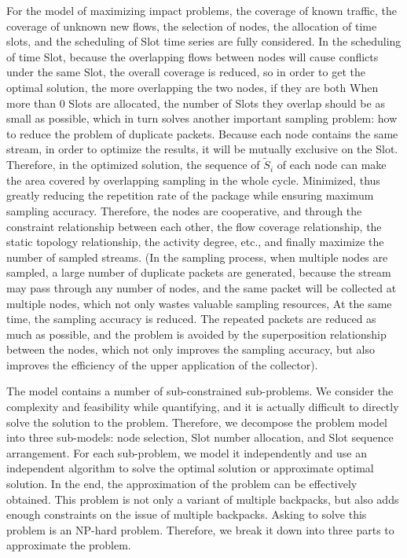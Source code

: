 \documentclass[conference,compsoc]{IEEEtran}
\begin{document}
For the model of maximizing impact problems, the coverage of known traffic, the coverage of unknown new flows, the selection of nodes, the allocation of time slots, and the scheduling of Slot time series are fully considered. In the scheduling of time Slot, because the overlapping flows between nodes will cause conflicts under the same Slot, the overall coverage is reduced, so in order to get the optimal solution, the more overlapping the two nodes, if they are both When more than 0 Slots are allocated, the number of Slots they overlap should be as small as possible, which in turn solves another important sampling problem: how to reduce the problem of duplicate packets. Because each node contains the same stream, in order to optimize the results, it will be mutually exclusive on the Slot. Therefore, in the optimized solution, the sequence of $\widetilde S_i$ of each node can make the area covered by overlapping sampling in the whole cycle. Minimized, thus greatly reducing the repetition rate of the package while ensuring maximum sampling accuracy. Therefore, the nodes are cooperative, and through the constraint relationship between each other, the flow coverage relationship, the static topology relationship, the activity degree, etc., and finally maximize the number of sampled streams. (In the sampling process, when multiple nodes are sampled, a large number of duplicate packets are generated, because the stream may pass through any number of nodes, and the same packet will be collected at multiple nodes, which not only wastes valuable sampling resources, At the same time, the sampling accuracy is reduced. The repeated packets are reduced as much as possible, and the problem is avoided by the superposition relationship between the nodes, which not only improves the sampling accuracy, but also improves the efficiency of the upper application of the collector).

The model contains a number of sub-constrained sub-problems. We consider the complexity and feasibility while quantifying, and it is actually difficult to directly solve the solution to the problem. Therefore, we decompose the problem model into three sub-models: node selection, Slot number allocation, and Slot sequence arrangement. For each sub-problem, we model it independently and use an independent algorithm to solve the optimal solution or approximate optimal solution. In the end, the approximation of the problem can be effectively obtained.
This problem is not only a variant of multiple backpacks, but also adds enough constraints on the issue of multiple backpacks. Asking to solve this problem is an NP-hard problem. Therefore, we break it down into three parts to approximate the problem.
\end{document}
